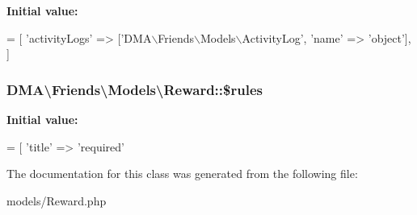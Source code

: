 {\bfseries Initial value\+:}
\begin{DoxyCode}
= [ 
        \textcolor{stringliteral}{'activityLogs'}  => [\textcolor{stringliteral}{'DMA\(\backslash\)Friends\(\backslash\)Models\(\backslash\)ActivityLog'}, \textcolor{stringliteral}{'name'} => \textcolor{stringliteral}{'object'}],
    ]
\end{DoxyCode}
\hypertarget{classDMA_1_1Friends_1_1Models_1_1Reward_ab0f53a612317c68e59e32e0c4a4a2590}{
\subsubsection[{\$rules}]{\setlength{\rightskip}{0pt plus 5cm}D\+M\+A\textbackslash{}\+Friends\textbackslash{}\+Models\textbackslash{}\+Reward\+::\$rules}}\label{classDMA_1_1Friends_1_1Models_1_1Reward_ab0f53a612317c68e59e32e0c4a4a2590}
{\bfseries Initial value\+:}
\begin{DoxyCode}
= [ 
        \textcolor{stringliteral}{'title'} => \textcolor{stringliteral}{'required'}
\end{DoxyCode}


The documentation for this class was generated from the following file\+:\begin{DoxyCompactItemize}
\item 
models/Reward.\+php\end{DoxyCompactItemize}
